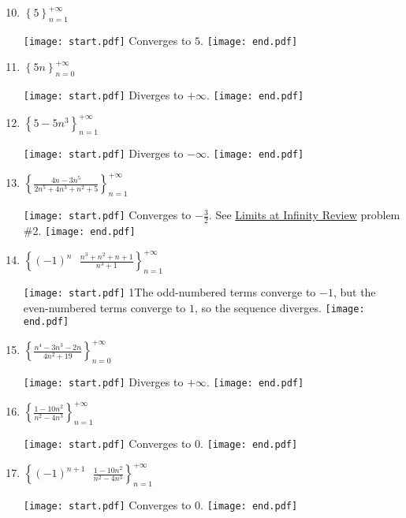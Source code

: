 \documentclass[12pt]{article}
\begin{document}
\begin{enumerate}
\setcounter{enumi}{9}
  
\item $\left\{ 5 \right\}_{n = 1}^{+\infty}$

\texttt{[image: start.pdf]}
{{Converges to $5$.}}
\texttt{[image: end.pdf]}


\item $\left\{ 5n \right\}_{n = 0}^{+\infty}$

\texttt{[image: start.pdf]}
{{Diverges to $+\infty$.}}
\texttt{[image: end.pdf]}


\item $\left\{ 5-5n^3 \right\}_{n = 1}^{+\infty}$

\texttt{[image: start.pdf]}
{{Diverges to $-\infty$.}}
\texttt{[image: end.pdf]}


\item $\left\{ \frac{4n-3n^5}{2n^5+4n^3+n^2+5} \right\}_{n = 1}^{+\infty}$

\texttt{[image: start.pdf]}
{{Converges to $-\frac{3}{2}$.  See \underline{Limits at Infinity Review} problem \#2.}}
\texttt{[image: end.pdf]}


\item $\left\{ (-1)^n \text{ } \frac{n^3+n^2+n+1}{n^3+1} \right\}_{n = 1}^{+\infty}$

\texttt{[image: start.pdf]}
{{{1\linewidth}{The odd-numbered terms converge to $-1$, but the even-numbered terms converge to $1$, so the sequence diverges.}}}
\texttt{[image: end.pdf]}


\item $\left\{ \frac{n^4-3n^3-2n}{4n^2+19} \right\}_{n = 0}^{+\infty}$

\texttt{[image: start.pdf]}
{{Diverges to $+\infty$.}}
\texttt{[image: end.pdf]}


\item $\left\{ \frac{1-10n^2}{n^2-4n^3} \right\}_{n = 1}^{+\infty}$

\texttt{[image: start.pdf]}
{{Converges to $0$.}}
\texttt{[image: end.pdf]}


\item $\left\{ (-1)^{n+1} \text{ } \frac{1-10n^2}{n^2-4n^3} \right\}_{n = 1}^{+\infty}$

\texttt{[image: start.pdf]}
{{Converges to $0$.}}
\texttt{[image: end.pdf]}



\end{enumerate}
\end{document}
